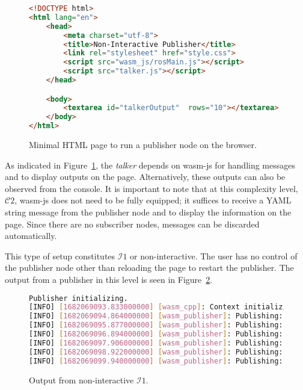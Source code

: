         \begin{figure}[htbp]
            \begin{lstlisting}[language=html]
<!DOCTYPE html>
<html lang="en">
    <head>
        <meta charset="utf-8">
        <title>Non-Interactive Publisher</title>
        <link rel="stylesheet" href="style.css">
        <script src="wasm_js/rosMain.js"></script>
        <script src="talker.js"></script>
    </head>

    <body>
        <textarea id="talkerOutput"  rows="10"></textarea>
    </body>
</html>
\end{lstlisting}
            \caption{Minimal \ac{HTML} page to run a publisher node on the browser.}
            \label{fig:html}
        \end{figure}

        As indicated in Figure~\ref{fig:html}, the \textit{talker} depends on \textsf{wasm-js} for handling messages and to display outputs on the page. Alternatively, these outputs can also be observed from the console. It is important to note that at this complexity level, $\mathcal{C}2$, \textsf{wasm-js} does not need to be fully equipped; it suffices to receive a \ac{YAML} string message from the publisher node and to display the information on the page. Since there are no subscriber nodes, messages can be discarded automatically.
        
        This type of setup constitutes $\mathcal{I}1$ or non-interactive. The user has no control of the publisher node other than reloading the page to restart the publisher. The output from a publisher in this level is seen in Figure~\ref{fig:ui1}. 

        \begin{figure}[htbp]
            \centering

            \begin{lstlisting}[language=Bash]
Publisher initializing.
[INFO] [1682069093.833000000] [wasm_cpp]: Context initializing.
[INFO] [1682069094.864000000] [wasm_publisher]: Publishing: 'Hello there! 0'
[INFO] [1682069095.877000000] [wasm_publisher]: Publishing: 'Hello there! 1'
[INFO] [1682069096.894000000] [wasm_publisher]: Publishing: 'Hello there! 2'
[INFO] [1682069097.906000000] [wasm_publisher]: Publishing: 'Hello there! 3'
[INFO] [1682069098.922000000] [wasm_publisher]: Publishing: 'Hello there! 4'
[INFO] [1682069099.940000000] [wasm_publisher]: Publishing: 'Hello there! 5'
\end{lstlisting}
            \caption{Output from non-interactive $\mathcal{I}1$.}\label{fig:ui1}
        \end{figure}

